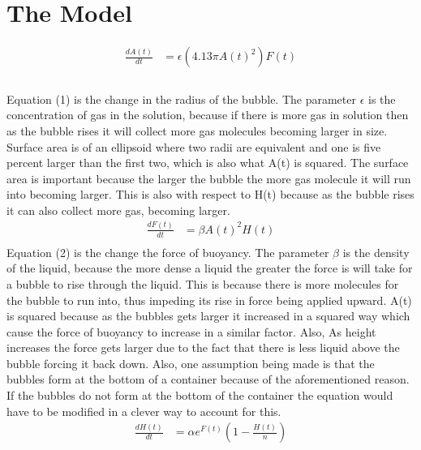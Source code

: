 \documentclass[11pt]{article}
\begin{document}
\section{The Model} \hfill\break
\begin{equation} \label{eq1}
\begin{split}
\frac{dA(t)}{dt} & =\epsilon (4.13 \pi A(t)^2)F(t) \\
\end{split}
\end{equation} \\
\indent Equation (1) is the change in the radius of the bubble. The parameter $\epsilon$ is the concentration of gas in the solution, because if there is more gas in solution then as the bubble rises it will collect more gas molecules becoming larger in size. Surface area is of an ellipsoid where two radii are equivalent and one is five percent larger than the first two, which is also what A(t) is squared. The surface area is important because the larger the bubble the more gas molecule it will run into becoming larger. This is also with respect to H(t) because as the bubble rises it can also collect more gas, becoming larger. \\
\begin{equation} \label{eq2}
\begin{split}
\frac{dF(t)}{dt} & =\beta  A(t)^2H(t) \\
\end{split}
\end{equation} 
\indent Equation (2) is the change the force of buoyancy. The parameter $\beta$ is the density of the liquid, because the more dense a liquid the greater the force is will take for a bubble to rise through the liquid. This is because there is more molecules for the bubble to run into, thus impeding its rise in force being applied upward. A(t) is squared because as the bubbles gets larger it increased in a squared way which cause the force of buoyancy to increase in a similar factor. Also, As height increases the force gets larger due to the fact that there is less liquid above the bubble forcing it back down. Also, one assumption being made is that the bubbles form at the bottom of a container because of the aforementioned reason. If the bubbles do not form at the bottom of the container the equation would have to be modified in a clever way to account for this. \\
\begin{equation} \label{eq3}
\begin{split}
\frac{dH(t)}{dt} & =\alpha e^{F(t)}(1- \frac {H(t)}{n}) \\
\end{split}
\end{equation}
\end{document}

